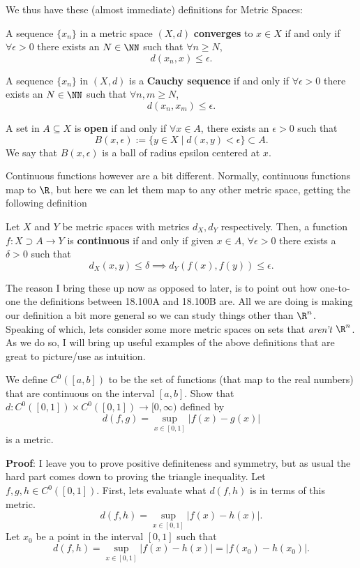 We thus have these (almost immediate) definitions for Metric Spaces:
\begin{definition}
A sequence $\{x_n\}$ in a metric space $(X,d)$ \textbf{converges} to $x\in X$ if and only if $\forall \epsilon>0$ there exists an $N\in \NN$ such that $\forall n \geq N$, 
\[
d(x_n, x) \leq \epsilon.
\]
\end{definition}

\begin{definition}
A sequence $\{x_n\}$ in $(X,d)$ is a \textbf{Cauchy sequence} if and only if $\forall \epsilon>0$ there exists an $N\in \NN$ such that $\forall n,m \geq N$, 
\[
d(x_n, x_m) \leq \epsilon.
\]
\end{definition}

\begin{definition}
A set in $A\subseteq X$ is \textbf{open} if and only if $\forall x\in A$, there exists an $\epsilon >0$ such that 
\[
B(x,\epsilon) := \{y\in X \mid d(x,y) < \epsilon\} \subset A.
\]
We say that $B(x,\epsilon)$ is a ball of radius epsilon centered at $x$.
\end{definition}

Continuous functions however are a bit different. Normally, continuous functions map to $\R$, but here we can let them map to any other metric space, getting the following definition
\begin{definition}
Let $X$ and $Y$ be metric spaces with metrics $d_X,d_Y$ respectively. Then, a function $f: X \supset A \to Y$ is \textbf{continuous} if and only if given $x\in A$, $\forall \epsilon >0$ there exists a $\delta >0$ such that 
\[
d_X(x,y) \leq \delta \implies d_Y(f(x), f(y)) \leq \epsilon.
\]
\end{definition}

The reason I bring these up now as opposed to later, is to point out how one-to-one the definitions between 18.100A and 18.100B are. All we are doing is making our definition a bit more general so we can study things other than $\R^n$. Speaking of which, lets consider some more metric spaces on sets that \textit{aren't} $\R^n$. As we do so, I will bring up useful examples of the above definitions that are great to picture/use as intuition.

\begin{example}
We define $C^0([a,b])$ to be the set of functions (that map to the real numbers) that are continuous on the interval $[a,b]$. Show that $d:C^0([0,1]) \times C^0([0,1])\to [0,\infty)$ defined by 
\[
d(f,g) = \sup_{x\in [0,1]} |f(x) - g(x)|
\]
is a metric.
\end{example}
\textbf{Proof}: I leave you to prove positive definiteness and symmetry, but as usual the hard part comes down to proving the triangle inequality. Let $f,g,h \in C^0([0,1])$. First, lets evaluate what $d(f,h)$ is in terms of this metric.
\[d(f,h) = \sup_{x\in [0,1]} |f(x) - h(x) |.\] Let $x_0$ be a point in the interval $[0,1]$ such that \[d(f,h) = \sup_{x\in [0,1]} |f(x) - h(x) | = |f(x_0) - h(x_0)|.\]

